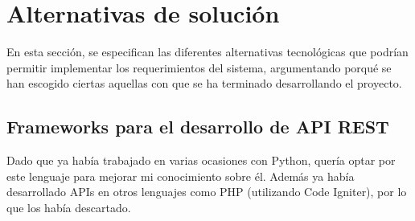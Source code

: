 \section{Alternativas de solución}
\label{sec:alternativas-solucion}

En esta sección, se especifican las diferentes alternativas tecnológicas que
podrían permitir implementar los requerimientos del sistema, argumentando porqué
se han escogido ciertas aquellas con que se ha terminado desarrollando el
proyecto.

\subsection{Frameworks para el desarrollo de API REST}
\label{subsec:frameworks}

Dado que ya había trabajado en varias ocasiones con Python, quería optar por este
lenguaje para mejorar mi conocimiento sobre él. Además ya había desarrollado
APIs en otros lenguajes como PHP (utilizando Code Igniter), por lo que los había
descartado.

